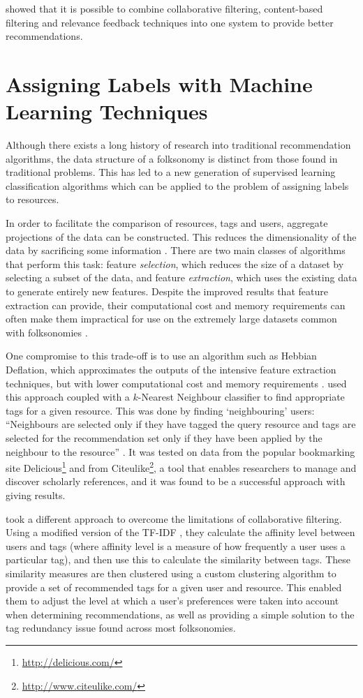 \documentclass[11pt,a4paper]{report}
\begin{document}
\textcite{Utiyama:2006} showed that it is possible to combine collaborative filtering, content-based filtering and relevance feedback techniques into one system to provide better recommendations.

\section{Assigning Labels with Machine Learning Techniques}
Although there exists a long history of research into traditional recommendation algorithms, the data structure of a folksonomy is distinct from those found in traditional problems. This has led to a new generation of supervised learning classification algorithms which can be applied to the problem of assigning labels to resources.

In order to facilitate the comparison of resources, tags and users, aggregate projections of the data can be constructed. This reduces the dimensionality of the data by sacrificing some information \parencite{Schmitz:2006}. There are two main classes of algorithms that perform this task: feature \emph{selection}, which reduces the size of a dataset by selecting a subset of the data, and feature \emph{extraction}, which uses the existing data to generate entirely new features. Despite the improved results that feature extraction can provide, their computational cost and memory requirements can often make them impractical for use on the extremely large datasets common with folksonomies \parencite{Gemmell:2009}.

One compromise to this trade-off is to use an algorithm such as Hebbian Deflation, which approximates the outputs of the intensive feature extraction techniques, but with lower computational cost and memory requirements \parencite{Oja:1985}. \textcite{Gemmell:2009} used this approach coupled with a $k$-Nearest Neighbour classifier to find appropriate tags for a given resource. This was done by finding `neighbouring' users: ``Neighbours are selected only if they have tagged the query resource and tags are selected for the recommendation set only if they have been applied by the neighbour to the resource'' \parencite{Gemmell:2009}. It was tested on data from the popular bookmarking site Delicious\footnote{\url{http://delicious.com/}} and from Citeulike\footnote{\url{http://www.citeulike.com/}}, a tool that enables researchers to manage and discover scholarly references, and it was found to be a successful approach with giving results.

\textcite{Niwa:2006} took a different approach to overcome the limitations of collaborative filtering. Using a modified version of the TF-IDF \parencite{Salton:1988}, they calculate the affinity level between users and tags (where affinity level is a measure of how frequently a user uses a particular tag), and then use this to calculate the similarity between tags. These similarity measures are then clustered using a custom clustering algorithm to provide a set of recommended tags for a given user and resource. This enabled them to adjust the level at which a user's preferences were taken into account when determining recommendations, as well as providing a simple solution to the tag redundancy issue found across most folksonomies.
\end{document}
